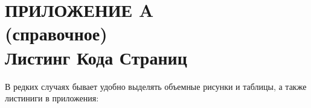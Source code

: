 \renewcommand{\thefigure}{\Asbuk{section}.\arabic{figure}}
\renewcommand{\thetable}{\Asbuk{section}.\arabic{table}}
\renewcommand{\thelstlisting}{\Asbuk{section}.\arabic{lstlisting}}

\pagestyle{fancy}
\thispagestyle{plain}

\section*{ПРИЛОЖЕНИЕ A\\(справочное)\\Листинг Кода Страниц}

\setcounter{section}{1}
\setcounter{figure}{0}
\setcounter{table}{0}
\setcounter{lstlisting}{0}

В редких случаях бывает удобно выделять объемные рисунки и таблицы, а также листиниги в приложения:

